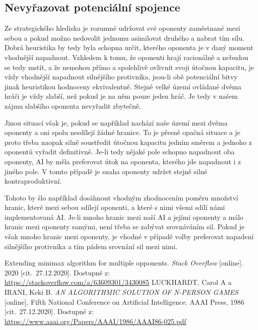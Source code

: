 \documentclass[a4paper]{article}
\begin{document}
\subsection{Nevyřazovat potenciální spojence}
Ze strategického hlediska je rozumné udržovat své oponenty zaměstnané mezi sebou a pokud možno nedovolit jednomu asimilovat druhého a nabrat tím sílu. Dobrá heuristika by tedy byla schopna určit, kterého oponenta je v daný moment vhodnější napadnout. Vzhledem k tomu, že oponenti hrají racionálně a nebudou se tedy mstít, a že nemohou přímo a spolehlivě ovlivnit svoji útočnou kapacitu, je vždy vhodnější napadnout silnějšího protivníka, jsou-li obě potenciální bitvy jinak heuristikou hodnoceny ekvivalentně. Stejně velké území ovládané dvěma hráči je vždy slabší, než pokud je na něm pouze jeden hráč. Je tedy v našem zájmu slabšího oponenta nevyřadit zbytečně.

Jinou situací však je, pokud se například nachází naše území mezi dvěma oponenty a oni spolu nesdílejí žádné hranice. To je přesně opačná situace a je proto třeba naopak silně soustředit útočnou kapacitu jedním směrem a jednoho z oponentů vyřadit definitivně. Je-li tedy nějaké pole schopno napadnout oba oponenty, AI by měla preferovat útok na oponenta, kterého jde napadnout i z jiného pole. V tomto případě je snaha oponenty udržet stejně silné kontraproduktivní. 

Tohoto by šlo například dosáhnout vhodným zhodnocením poměru množství hranic, které mezi sebou sdílejí oponenti, a které s nimi všemi sdílí námi implementovaná AI. Je-li mnoho hranic mezi naší AI a jejími oponenty a málo hranic mezi oponenty samými, není třeba se zabývat srovnáváním sil. Pokud je však mnoho hranic mezi oponenty, je vhodné v případě volby preferovat napadení silnějšího protivníka a tím pádem srovnání sil mezi nimi.
 
\vfill


\begin{thebibliography}{9}
Extending minimax algorithm for multiple opponents. \textit{Stack Overflow} [online]. 2020 [cit.~27.12.2020]. Dostupné z: \url{https://stackoverflow.com/a/63609301/3430085}
LUCKHARDT, Carol A a IRANI, Keki B. \textit{AN ALGORITHMIC SOLUTION OF N-PERSON GAMES} [online]. Fifth National Conference on Artificial Intelligence. AAAI Press, 1986 [cit.~27.12.2020]. Dostupné z: \url{https://www.aaai.org/Papers/AAAI/1986/AAAI86-025.pdf}
\end{thebibliography}
\end{document}
